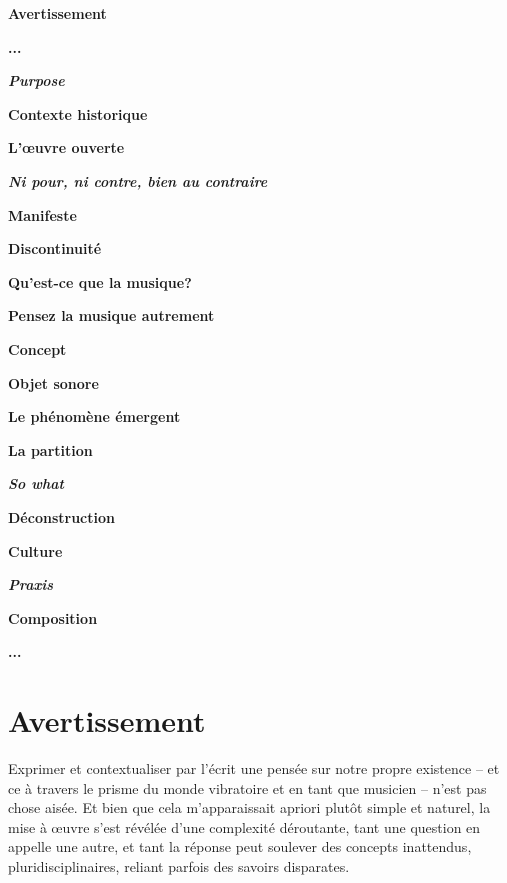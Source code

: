 \documentclass{article}
\begin{document}
\bigskip

\textbf{Avertissement} \dotfill \pageref{avertissement}

\textbf{...} \dotfill \pageref{one}

\textbf{\textsl{Purpose}} \dotfill \pageref{purpose}

\textbf{Contexte historique} \dotfill \pageref{histoire}

\textbf{L'œuvre ouverte} \dotfill \pageref{oo}

\textbf{\textit{Ni pour, ni contre, bien au contraire}} \dotfill 
\pageref{nini}

\qquad \textbf{Manifeste} \hfill \pageref{manifeste}

\qquad \textbf{Discontinuité} \hfill \pageref{discontinu}

\textbf{Qu’est-ce que la musique?} \dotfill \pageref{musique}

\textbf{Pensez la musique autrement} \dotfill \pageref{think}

\qquad \textbf{Concept} \hfill \pageref{concept}

\textbf{Objet sonore} \dotfill \pageref{os}

\qquad \textbf{Le phénomène émergent} \hfill \pageref{emergent}

\qquad \textbf{La partition} \hfill \pageref{score}

\textbf{\textsl{So what}} \dotfill \pageref{sowhat}

\qquad \textbf{Déconstruction} \hfill \pageref{deconstruction}

\qquad \textbf{Culture} \hfill \pageref{culture}

\qquad \textbf{\textit{Praxis}} \hfill \pageref{praxis}

\qquad \textbf{Composition} \hfill \pageref{composition}

\textbf{...} \dotfill \pageref{two}

\newpage

\section*{Avertissement}
\label{avertissement}

Exprimer et contextualiser par l'écrit une pensée sur notre propre existence -- et ce à travers le prisme du monde vibratoire et en tant que musicien -- n'est pas chose aisée. Et bien que cela m'apparaissait apriori plutôt simple et naturel, la mise à œuvre s'est révélée d'une complexité déroutante, tant une question en appelle une autre, et tant la réponse peut soulever des concepts inattendus, pluridisciplinaires, reliant parfois des savoirs disparates. 
\end{document}
